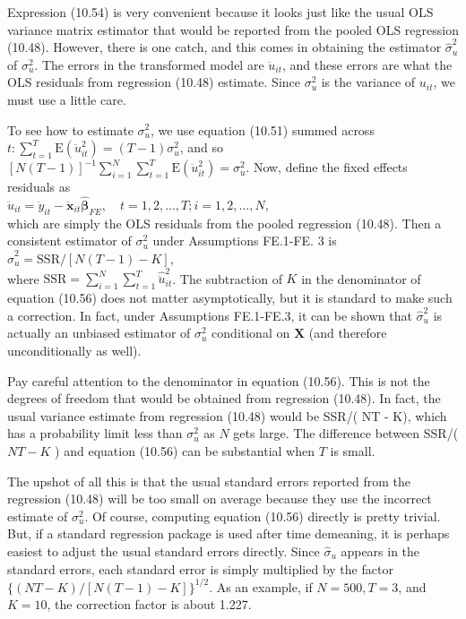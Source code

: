 \documentclass[10pt]{article}
\begin{document}
Expression (10.54) is very convenient because it looks just like the usual OLS variance matrix estimator that would be reported from the pooled OLS regression (10.48). However, there is one catch, and this comes in obtaining the estimator $\hat{\sigma}_{u}^{2}$ of $\sigma_{u}^{2}$. The errors in the transformed model are $\ddot{u}_{i t}$, and these errors are what the OLS residuals from regression (10.48) estimate. Since $\sigma_{u}^{2}$ is the variance of $u_{i t}$, we must use a little care.

To see how to estimate $\sigma_{u}^{2}$, we use equation (10.51) summed across $t: \sum_{t=1}^{T} \mathrm{E}\left(\ddot{u}_{i t}^{2}\right)= (T-1) \sigma_{u}^{2}$, and so $[N(T-1)]^{-1} \sum_{i=1}^{N} \sum_{t=1}^{T} \mathrm{E}\left(\ddot{u}_{i t}^{2}\right)=\sigma_{u}^{2}$. Now, define the fixed effects residuals as\\
$\hat{\ddot{u}}_{i t}=\ddot{y}_{i t}-\ddot{\mathbf{x}}_{i t} \hat{\boldsymbol{\beta}}_{F E}, \quad t=1,2, \ldots, T ; i=1,2, \ldots, N$,\\
which are simply the OLS residuals from the pooled regression (10.48). Then a consistent estimator of $\sigma_{u}^{2}$ under Assumptions FE.1-FE. 3 is\\
$\hat{\sigma}_{u}^{2}=\mathrm{SSR} /[N(T-1)-K]$,\\
where $\mathrm{SSR}=\sum_{i=1}^{N} \sum_{t=1}^{T} \hat{\ddot{u}}_{i t}^{2}$. The subtraction of $K$ in the denominator of equation (10.56) does not matter asymptotically, but it is standard to make such a correction. In fact, under Assumptions FE.1-FE.3, it can be shown that $\hat{\sigma}_{u}^{2}$ is actually an unbiased estimator of $\sigma_{u}^{2}$ conditional on $\mathbf{X}$ (and therefore unconditionally as well).

Pay careful attention to the denominator in equation (10.56). This is not the degrees of freedom that would be obtained from regression (10.48). In fact, the usual variance estimate from regression (10.48) would be SSR/( NT - K), which has a probability limit less than $\sigma_{u}^{2}$ as $N$ gets large. The difference between SSR/( $N T-K$ ) and equation (10.56) can be substantial when $T$ is small.

The upshot of all this is that the usual standard errors reported from the regression (10.48) will be too small on average because they use the incorrect estimate of $\sigma_{u}^{2}$. Of course, computing equation (10.56) directly is pretty trivial. But, if a standard regression package is used after time demeaning, it is perhaps easiest to adjust the usual standard errors directly. Since $\hat{\sigma}_{u}$ appears in the standard errors, each standard error is simply multiplied by the factor $\{(N T-K) /[N(T-1)-K]\}^{1 / 2}$. As an example, if $N=500, T=3$, and $K=10$, the correction factor is about 1.227.
\end{document}

